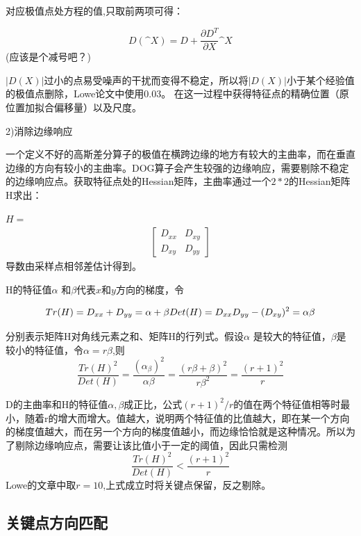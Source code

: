 \documentclass[12pt]{article}
\numberwithin{equation}{section}%
\begin{document}
对应极值点处方程的值,只取前两项可得：

\begin{equation}
D(\^{X})=D+\frac{\partial D^{T}}{\partial {X}}\^{X}
\end{equation}
(应该是个减号吧？)

$\left|D(X)\right|$过小的点易受噪声的干扰而变得不稳定，所以将$\left|D(X)\right|$小于某个经验值的极值点删除，Lowe论文中使用0.03。 在这一过程中获得特征点的精确位置（原位置加拟合偏移量）以及尺度。

2)消除边缘响应

一个定义不好的高斯差分算子的极值在横跨边缘的地方有较大的主曲率，而在垂直边缘的方向有较小的主曲率。DOG算子会产生较强的边缘响应，需要剔除不稳定的边缘响应点。获取特征点处的Hessian矩阵，主曲率通过一个$2*2$的Hessian矩阵H求出：

$H=$
\begin{gather*}
\begin{bmatrix}
D_{xx} & D_{xy}\\
D_{xy} & D_{yy}
\end{bmatrix}
\end{gather*}
导数由采样点相邻差估计得到。

H的特征值$\alpha$ 和$\beta$代表$x$和$y$方向的梯度，令

\begin{equation}
Tr(H)=D_{xx}+D_{yy}=\alpha +\beta \\
Det(H)=D_{xx}D_{yy}-(D_{xy})^{2}=\alpha \beta
\end{equation}

分别表示矩阵H对角线元素之和、矩阵H的行列式。假设$\alpha$ 是较大的特征值，$\beta$是较小的特征值，令$\alpha =r\beta$,则
\begin{equation}
\frac{Tr(H)^{2}}{Det(H)}=\frac{(\alpha_ \beta)^{2}}{\alpha \beta}=\frac{(r\beta +\beta)^{2}}{r\beta^{2}}=\frac{(r+1)^{2}}{r}
\end{equation}

D的主曲率和H的特征值$\alpha ,\beta$成正比，公式$(r+1)^{2}/r$的值在两个特征值相等时最小，随着r的增大而增大。值越大，说明两个特征值的比值越大，即在某一个方向的梯度值越大，而在另一个方向的梯度值越小，而边缘恰恰就是这种情况。所以为了剔除边缘响应点，需要让该比值小于一定的阈值，因此只需检测
\begin{equation}
\frac{Tr(H)^{2}}{Det(H)}<\frac{(r+1)^{2}}{r}
\end{equation}
Lowe的文章中取$r=10$,上式成立时将关键点保留，反之剔除。

\subsection{关键点方向匹配}
\end{document}
